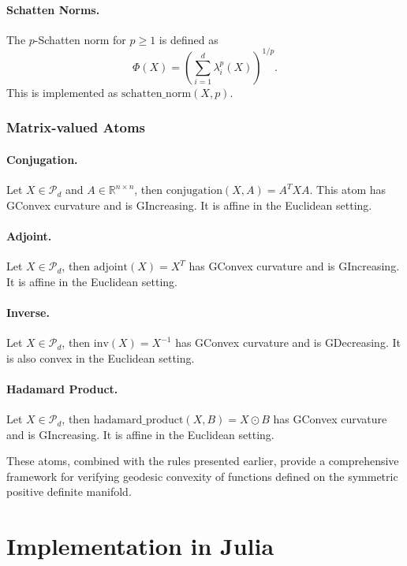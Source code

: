 \paragraph{Schatten Norms.} The $p$-Schatten norm for $p \geq 1$ is defined as
\begin{equation}
\Phi(X) = \left(\sum_{i=1}^d \lambda_i^p(X)\right)^{1/p}.
\end{equation}
This is implemented as $\text{schatten\_norm}(X, p)$.

\subsubsection{Matrix-valued Atoms}

\paragraph{Conjugation.} Let $X \in \mathcal{P}_d$ and $A \in \mathbb{R}^{n \times n}$, then $\text{conjugation}(X, A) = A^T X A$. This atom has GConvex curvature and is GIncreasing. It is affine in the Euclidean setting.

\paragraph{Adjoint.} Let $X \in \mathcal{P}_d$, then $\text{adjoint}(X) = X^T$ has GConvex curvature and is GIncreasing. It is affine in the Euclidean setting.

\paragraph{Inverse.} Let $X \in \mathcal{P}_d$, then $\text{inv}(X) = X^{-1}$ has GConvex curvature and is GDecreasing. It is also convex in the Euclidean setting.

\paragraph{Hadamard Product.} Let $X \in \mathcal{P}_d$, then $\text{hadamard\_product}(X, B) = X \odot B$ has GConvex curvature and is GIncreasing. It is affine in the Euclidean setting.

These atoms, combined with the rules presented earlier, provide a comprehensive framework for verifying geodesic convexity of functions defined on the symmetric positive definite manifold.

\section{Implementation in Julia}


